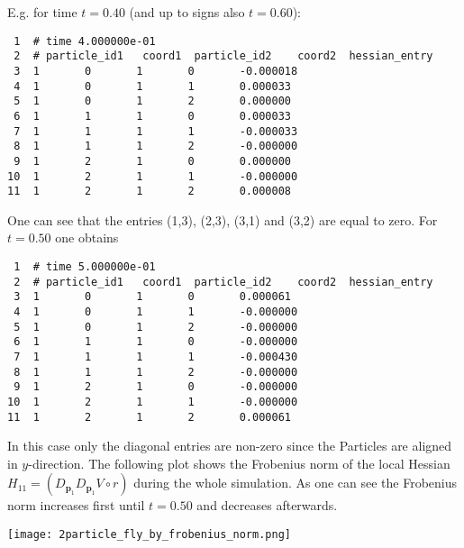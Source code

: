 \documentclass[a4paper]{article}
\newcommand{\boldp}{\boldsymbol{p}}
\begin{document}
\begin{enumerate}
E.g. for time \(t = 0.40\) (and up to signs also \(t = 0.60\)):
\begin{verbatim}
 1  # time 4.000000e-01
 2  # particle_id1   coord1  particle_id2    coord2  hessian_entry
 3  1       0       1       0       -0.000018
 4  1       0       1       1       0.000033
 5  1       0       1       2       0.000000
 6  1       1       1       0       0.000033
 7  1       1       1       1       -0.000033
 8  1       1       1       2       -0.000000
 9  1       2       1       0       0.000000
10  1       2       1       1       -0.000000
11  1       2       1       2       0.000008
\end{verbatim}
One can see that the entries (1,3), (2,3), (3,1) and (3,2) are equal to zero. For \(t = 0.50\) one obtains
\begin{verbatim}
 1  # time 5.000000e-01
 2  # particle_id1   coord1  particle_id2    coord2  hessian_entry
 3  1       0       1       0       0.000061
 4  1       0       1       1       -0.000000
 5  1       0       1       2       -0.000000
 6  1       1       1       0       -0.000000
 7  1       1       1       1       -0.000430
 8  1       1       1       2       -0.000000
 9  1       2       1       0       -0.000000
10  1       2       1       1       -0.000000
11  1       2       1       2       0.000061
\end{verbatim}
In this case only the diagonal entries are non-zero since the Particles are aligned in \(y\)-direction.
The following plot shows the Frobenius norm of the local Hessian \(H_{11} = (D_{\boldp_1} D_{\boldp_1} V\circ r)\) during the whole simulation.
As one can see the Frobenius norm increases first until \(t = 0.50\) and decreases afterwards.

\texttt{[image: 2particle\_fly\_by\_frobenius\_norm.png]}
\end{enumerate}
\end{document}
